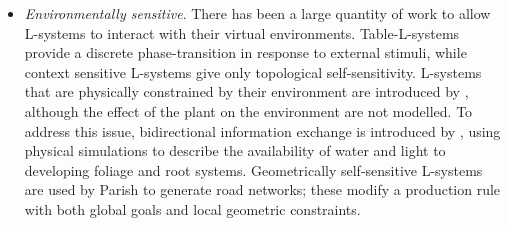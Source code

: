 \begin{itemize}
\item{\emph{Environmentally sensitive}. There has been a large quantity of work to allow L-systems to interact with their virtual environments. Table-L-systems provide a discrete phase-transition in response to external stimuli, while context sensitive L-systems give only topological self-sensitivity. L-systems that are physically constrained by their environment are introduced by \cite{Prusinkiewicz94}, although the effect of the plant on the environment are not modelled. To address this issue, bidirectional information exchange is introduced by \cite{Prusinkiewicz96}, using physical simulations to describe the availability of water and light to developing foliage and root systems. Geometrically self-sensitive L-systems are used by Parish\cite{Parish01} to generate road networks; these modify a production rule with both global goals and local geometric constraints.}
\end{itemize}







